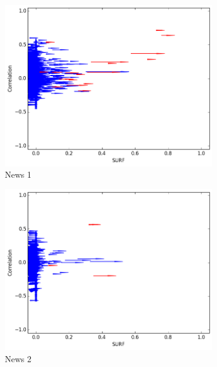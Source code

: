 \documentclass[10pt, journal,twocolumn]{IEEEtran}
\begin{document}
\begin{figure}[!ht]
\begin{subfigure}{.25\textwidth}
  \begin{center}
  \includegraphics[keepaspectratio,width=1\textwidth]{1}\\
{News 1}
  \end{center}
\end{subfigure}%
\begin{subfigure}{.25\textwidth}
  \begin{center}
  \includegraphics[keepaspectratio,width=1\textwidth]{2}\\
{News 2}
  \end{center}

\end{subfigure}
\end{figure}
\end{document}
